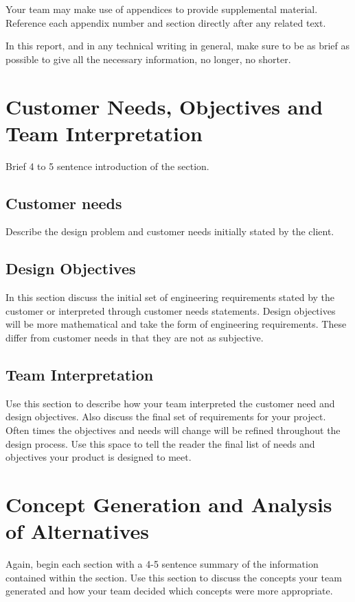 \documentclass[12pt]{article}
\begin{document}
Your team may make use of appendices to provide supplemental material.  Reference each appendix number and section directly after any related text.  

In this report, and in any technical writing in general, make sure to be as brief as possible to give all the necessary information, no longer, no shorter. 



\section{Customer Needs, Objectives and Team Interpretation}

Brief 4 to 5 sentence introduction of the section.  

\subsection{Customer needs}
Describe the design problem and customer needs initially stated by the client.  

\subsection{Design Objectives}
In this section discuss the initial set of engineering requirements stated by the customer or interpreted through customer needs statements.  Design objectives will be more mathematical and take the form of engineering requirements.  These differ from customer needs in that they are not as subjective.  


\subsection{Team Interpretation}
Use this section to describe how your team interpreted the customer need and design objectives.  Also discuss the final set of requirements for your project.  Often times the objectives and needs will change will be refined throughout the design process.  Use this space to tell the reader the final list of needs and objectives your product is designed to meet. 



\section{Concept Generation and Analysis of Alternatives}

Again, begin each section with a 4-5 sentence summary of the information contained within the section.  Use this section to discuss the concepts your team generated and how your team decided which concepts were more appropriate.  
\end{document}
